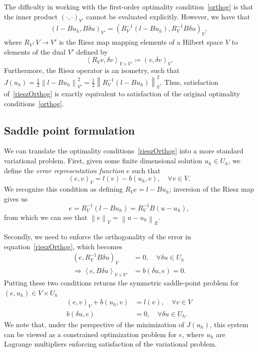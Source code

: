 \documentclass[final,leqno]{siamltex}
\newcommand{\nor}[1]{\left\| #1 \right\|}
\newcommand{\LRp}[1]{\left( #1 \right)}
\newcommand{\LRa}[1]{\left\langle #1 \right\rangle}
\begin{document}
The difficulty in working with the first-order optimality condition~\eqref{orthog} is that the inner product $\LRp{\cdot,\cdot}_{V'}$ cannot be evaluated explicitly.  However, we have that 
\begin{align}
\left(l-Bu_h,B\delta u\right)_{V'} = \left(R_V^{-1}(l-Bu_h),R_V^{-1}B\delta u\right)_{V},
\label{rieszOrthog}
\end{align}
where $R_V: V\rightarrow V'$ is the Riesz map mapping elements of a Hilbert space $V$ to elements of the dual $V'$ defined by
\[
\LRa{R_Vv,\delta v}_{V\times V'} \coloneqq \LRp{v,\delta v}_V.
\]
Furthermore, the Riesz operator is an isometry, such that $J(u_h) = \frac{1}{2}\nor{l-Bu_h}^2_{V'} = \frac{1}{2}\nor{R_V^{-1}(l-Bu_h)}^2_{V}$.  Thus, satisfaction of~\eqref{rieszOrthog} is exactly equivalent to satisfaction of the original optimality conditions~\eqref{orthog}.  

\subsection{Saddle point formulation}
\label{sec:saddlePoint}
We can translate the optimality conditions~\eqref{rieszOrthog} into a more standard variational problem.  First, given some finite dimensional solution $u_h\in U_h$, we define the \textit{error representation function} $e$ such that
\[
\LRp{e,v}_V = l(v)-b(u_h,v), \quad \forall v\in V.
\]
We recognize this condition as defining $R_V e = l-Bu_h$; inversion of the Riesz map gives us 
\[
e = R_V^{-1}\LRp{l-Bu_h} = R_V^{-1}B\LRp{u-u_h},
\]
from which we can see that $\nor{e}_V = \nor{u-u_h}_E$.  

Secondly, we need to enforce the orthogonality of the error in equation~\eqref{rieszOrthog}, which becomes
\begin{align*}
\LRp{e,R_V^{-1}B\delta u}_V &= 0, \quad \forall \delta u \in U_h\\
\Rightarrow \LRa{e,B\delta u}_{V\times V'} &= b(\delta u, e) = 0.
\end{align*}
Putting these two conditions returns the symmetric saddle-point problem for $\LRp{e,u_h} \in V\times U_h$
\begin{align*}
\LRp{e,v}_V + b(u_h,v) &= l(v), \quad \forall v\in V\\
b(\delta u, e) &= 0, \quad \forall \delta u \in U_h.
\end{align*}
We note that, under the perspective of the minimization of $J(u_h)$, this system can be viewed as a constrained optimization problem for $e$, where $u_h$ are Lagrange multipliers enforcing satisfaction of the variational problem.  
\end{document}
